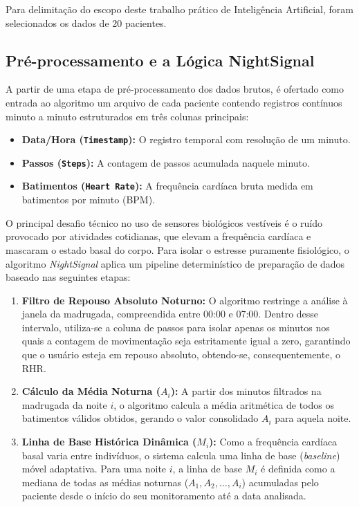 Para delimitação do escopo deste trabalho prático de Inteligência Artificial, foram selecionados os dados de 20 pacientes. 

\subsection{Pré-processamento e a Lógica NightSignal}

A partir de uma etapa de pré-processamento dos dados brutos, é ofertado como entrada ao algoritmo um arquivo de cada paciente contendo registros contínuos minuto a minuto estruturados em três colunas principais:
\begin{itemize}
    \item \textbf{Data/Hora (\texttt{Timestamp}):} O registro temporal com resolução de um minuto.
    \item \textbf{Passos (\texttt{Steps}):} A contagem de passos acumulada naquele minuto.
    \item \textbf{Batimentos (\texttt{Heart Rate}):} A frequência cardíaca bruta medida em batimentos por minuto (BPM).
\end{itemize}


O principal desafio técnico no uso de sensores biológicos vestíveis é o ruído provocado por atividades cotidianas, que elevam a frequência cardíaca e mascaram o estado basal do corpo. Para isolar o estresse puramente fisiológico, o algoritmo \textit{NightSignal} aplica um pipeline determinístico de preparação de dados baseado nas seguintes etapas:

\begin{enumerate}
    \item \textbf{Filtro de Repouso Absoluto Noturno:} O algoritmo restringe a análise à janela da madrugada, compreendida entre 00:00 e 07:00. Dentro desse intervalo, utiliza-se a coluna de passos para isolar apenas os minutos nos quais a contagem de movimentação seja estritamente igual a zero, garantindo que o usuário esteja em repouso absoluto, obtendo-se, consequentemente, o RHR.
    \item \textbf{Cálculo da Média Noturna ($A_i$):} A partir dos minutos filtrados na madrugada da noite $i$, o algoritmo calcula a média aritmética de todos os batimentos válidos obtidos, gerando o valor consolidado $A_i$ para aquela noite.
    \item \textbf{Linha de Base Histórica Dinâmica ($M_i$):} Como a frequência cardíaca basal varia entre indivíduos, o sistema calcula uma linha de base (\textit{baseline}) móvel adaptativa. Para uma noite $i$, a linha de base $M_i$ é definida como a mediana de todas as médias noturnas ($A_1, A_2, \dots, A_i$) acumuladas pelo paciente desde o início do seu monitoramento até a data analisada.
\end{enumerate}

